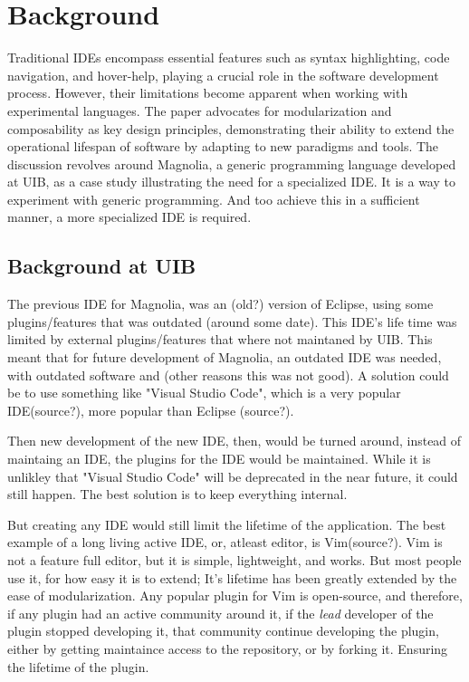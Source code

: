 \section{Background}

Traditional IDEs encompass essential features such as syntax highlighting, code navigation, and hover-help,
playing a crucial role in the software development process. However, their limitations become apparent when
working with experimental languages. The paper advocates for modularization and composability as key design principles,
demonstrating their ability to extend the operational lifespan of software by adapting to new paradigms and tools.
The discussion revolves around Magnolia, a generic programming language developed at UIB, as a case study
illustrating the need for a specialized IDE. It is a way to experiment with generic programming.
And too achieve this in a sufficient manner, a more specialized IDE is required.

\subsection{Background at UIB}

The previous IDE for Magnolia, was an (old?) version of Eclipse, using some plugins/features that was
outdated (around some date). This IDE's life time was limited by external plugins/features that where 
not maintaned by UIB. This meant that for future development of Magnolia, an outdated IDE was needed, with
outdated software and (other reasons this was not good). A solution could be to use something like
"Visual Studio Code", which is a very popular IDE(source?), more popular than Eclipse (source?).

Then new development of the new IDE, then, would be turned around, instead of maintaing an IDE, the plugins
for the IDE would be maintained. While it is unlikley that "Visual Studio Code" will be deprecated in the
near future, it could still happen. The best solution is to keep everything internal.

But creating any IDE would still limit the lifetime of the application. The best example of a long living active
IDE, or, atleast editor, is Vim(source?). Vim is not a feature full editor, but it is simple, lightweight, and works.
But most people use it, for how easy it is to extend; It's lifetime has been greatly extended by the ease of modularization.
Any popular plugin for Vim is open-source, and therefore, if any plugin had an active community around it,
if the \textit{lead} developer of the plugin stopped developing it, that community continue developing the plugin, either
by getting maintaince access to the repository, or by forking it. Ensuring the lifetime of the plugin.

